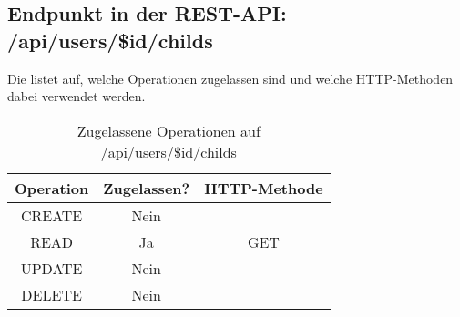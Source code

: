 \subsection{Endpunkt in der REST-API: /api/users/\$id/childs}
Die  listet auf, welche Operationen zugelassen sind und welche HTTP-Methoden dabei verwendet werden. 

\begin{table}[!htbp]
	\begin{tabular}{|c|c|c|}
		\hline
			\textbf{Operation} & \textbf{Zugelassen?} & \textbf{HTTP-Methode} \\ \hline
			CREATE & Nein &  \\ \hline 
			READ & Ja & GET \\ \hline
			UPDATE & Nein & \\ \hline 
			DELETE & Nein & \\ \hline
	\end{tabular}

		\caption{Zugelassene Operationen auf /api/users/\$id/childs}
		\label{tab:rest:api:users:id:childs:meth}
\end{table}

